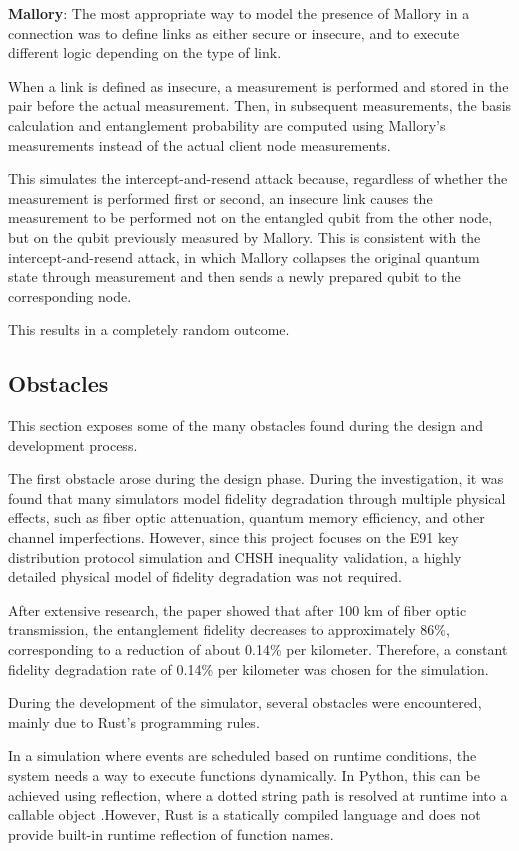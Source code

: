 \textbf{Mallory}: The most appropriate way to model the presence of Mallory in a connection was to define links as either secure or insecure, and to execute different logic depending on the type of link.

When a link is defined as insecure, a measurement is performed and stored in the pair before the actual measurement. Then, in subsequent measurements, the basis calculation and entanglement probability are computed using Mallory's measurements instead of the actual client node measurements.

This simulates the intercept-and-resend attack because, regardless of whether the measurement is performed first or second, an insecure link causes the measurement to be performed not on the entangled qubit from the other node, but on the qubit previously measured by Mallory. This is consistent with the intercept-and-resend attack, in which Mallory collapses the original quantum state through measurement and then sends a newly prepared qubit to the corresponding node.

This results in a completely random outcome.

\subsection{Obstacles}\label{s:obstacles}
This section exposes some of the many obstacles found during the design and development process.

The first obstacle arose during the design phase. During the investigation, it was found that many simulators model fidelity degradation through multiple physical effects, such as fiber optic attenuation, quantum memory efficiency, and other channel imperfections. However, since this project focuses on the E91 key distribution protocol simulation and CHSH inequality validation, a highly detailed physical model of fidelity degradation was not required.

After extensive research, the paper \cite{sena2025entanglement} showed that after 100 km of fiber optic transmission, the entanglement fidelity decreases to approximately 86\%, corresponding to a reduction of about 0.14\% per kilometer. Therefore, a constant fidelity degradation rate of 0.14\% per kilometer was chosen for the simulation.

During the development of the simulator, several obstacles were encountered, mainly due to Rust's programming rules.

In a simulation where events are scheduled based on runtime conditions, the system needs a way to execute functions dynamically. In Python, this can be achieved using reflection, where a dotted string path is resolved at runtime into a callable object .However, Rust is a statically compiled language and does not provide built-in runtime reflection of function names. 

